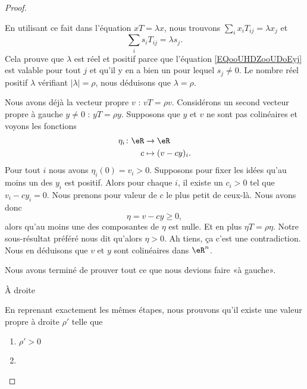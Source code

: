 \begin{proof}
\begin{subproof}
		En utilisant ce fait dans l'équation \( xT=\lambda x\), nous trouvons \( \sum_ix_iT_{ij}=\lambda x_j\) et
		\begin{equation}        \label{EQooUHDZooUDoEyj}
			\sum_is_iT_{ij}=\lambda s_j.
		\end{equation}
		Cela prouve que \( \lambda\) est réel et positif parce que l'équation \eqref{EQooUHDZooUDoEyj} est valable pour tout \( j\) et qu'il y en a bien un pour lequel \( s_j\neq 0\). Le nombre réel positif \( \lambda\) vérifiant \( | \lambda |=\rho\), nous déduisons que \( \lambda=\rho\).

		Nous avons déjà la vecteur propre \( v\) : \( vT=\rho v\). Considérons un second vecteur propre à gauche \( y\neq 0\) : \( yT=\rho y\). Supposons que \( y\) et \( v\) ne sont pas colinéaires et voyons les fonctions
		\begin{equation}
			\begin{aligned}
				\eta_i\colon \eR & \to \eR            \\
				c                & \mapsto  (v-cy)_i.
			\end{aligned}
		\end{equation}
		Pour tout \( i\) nous avons \( \eta_i(0)=v_i>0\). Supposons pour fixer les idées qu'au moins un des \( y_i\) est positif. Alors pour chaque \( i\), il existe un \( c_i>0\) tel que \( v_i-cy_i=0\). Nous prenons pour valeur de \( c\) le plus petit de ceux-là. Nous avons donc
		\begin{equation}
			\eta=v-cy\geq 0,
		\end{equation}
		alors qu'au moins une des composantes de \( \eta\) est nulle. Et en plus \( \eta T=\rho\eta\). Notre sous-résultat préféré nous dit qu'alors \( \eta>0\). Ah tiens, ça c'est une contradiction. Nous en déduisons que \( v\) et \( y\) sont colinéaires dans \( \eR^n\).
	\end{subproof}
	Nous avons terminé de prouver tout ce que nous devions faire «à gauche».
	\begin{center}
		À droite
	\end{center}
	En reprenant exactement les mêmes étapes, nous prouvons qu'il existe une valeur propre à droite \( \rho'\) telle que
	\begin{enumerate}
		\item
		      \( \rho'>0\)
		\item

\end{enumerate}
\end{proof}

